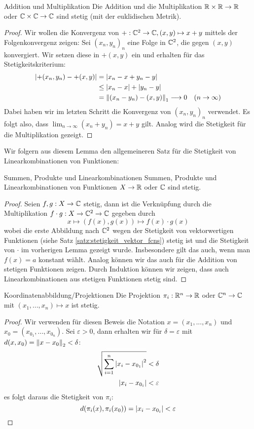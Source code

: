 \begin{lemma}{Addition und Multiplikation}{}
Die Addition und die Multiplikation $\mathbb{R} \times \mathbb{R} \to \mathbb{R}$ oder $\mathbb{C} \times \mathbb{C} \to \mathbb{C}$ sind stetig (mit der euklidischen Metrik).
\end{lemma}
\begin{proof} Wir wollen die Konvergenz von $+: \mathbb{C}^2 \to \mathbb{C}, (x,y) \mapsto x + y$ mittels der Folgenkonvergenz zeigen: Sei $(x_n,y_n)_n$ eine Folge in $\mathbb{C}^2$, die gegen $(x,y)$ konvergiert. Wir setzen diese in $+(x,y)$ ein und erhalten für das Stetigkeitskriterium:
\begin{align*}
    \left|+(x_n,y_n) - +(x, y)\right| &= \left|x_n - x + y_n - y\right|\\
    &\leq \left|x_n-x\right| + \left|y_n - y\right|\\
    &= \left\|(x_n-y_n) - (x,y)\right\|_1 \longrightarrow 0 \quad (n \to \infty)
\end{align*}
Dabei haben wir im letzten Schritt die Konvergenz von  $(x_n,y_n)_n$ verwendet. Es folgt also, dass $\lim_{n \to \infty}(x_n + y_n) = x+y$ gilt. Analog wird die Stetigkeit für die Multiplikation gezeigt.
\end{proof}
Wir folgern aus diesem Lemma den allgemeineren Satz für die Stetigkeit von Linearkombinationen von Funktionen:
\begin{satz}{Summen, Produkte und Linearkombinationen}{}
Summen, Produkte und Linearkombinationen von Funktionen $X \to \mathbb{R}$ oder $\mathbb{C}$ sind stetig.
\end{satz}
\begin{proof}
Seien $f,g : X \to \mathbb{C}$ stetig, dann ist die Verknüpfung durch die Multiplikation $f \cdot g : X \to \mathbb{C}^2 \to \mathbb{C}$ gegeben durch
$$ x \mapsto (f(x), g(x)) \mapsto f(x) \cdot g(x)$$
wobei die erste Abbildung nach $\mathbb{C}^2$ wegen der Stetigkeit von vektorwertigen Funktionen (siehe Satz \ref{satz:stetigkeit_vektor_fcns}) stetig ist und die Stetigkeit von $\cdot$ im vorherigen Lemma gezeigt wurde. Insbesondere gilt das auch, wenn man $f(x) = a$ konstant wählt. Analog können wir das auch für die Addition von stetigen Funktionen zeigen. Durch Induktion können wir zeigen, dass auch Linearkombinationen aus stetigen Funktionen stetig sind.
\end{proof}
\begin{lemma}{Koordinatenabbildung/Projektionen}{}
Die Projektion $\pi_i : \mathbb{R}^n \to \mathbb{R}$ oder $\mathbb{C}^n \to \mathbb{C}$ mit $(x_1,...,x_n) \mapsto x$ ist stetig.
\end{lemma}
\begin{proof}
Wir verwenden für diesen Beweis die Notation $x = (x_1, ..., x_n)$ und $x_0 = (x_{0_1}, ..., x_{0_n})$. Sei $\varepsilon > 0$, dann erhalten wir für $\delta = \varepsilon$ mit $d(x, x_0) =    \left\|x-x_0\right\|_2 < \delta$:
\begin{align*}
    \sqrt{\sum_{i=1}^n \left|x_i - x_{0_1}\right|^2} &< \delta\\
    \left|x_i - x_{0_i}\right| &< \varepsilon
\end{align*}
es folgt daraus die Stetigkeit von $\pi_i$:
$$d(\pi_i(x) , \pi_i(x_0)) = \left|x_i - x_{0_i}\right| < \varepsilon$$
\end{proof}

